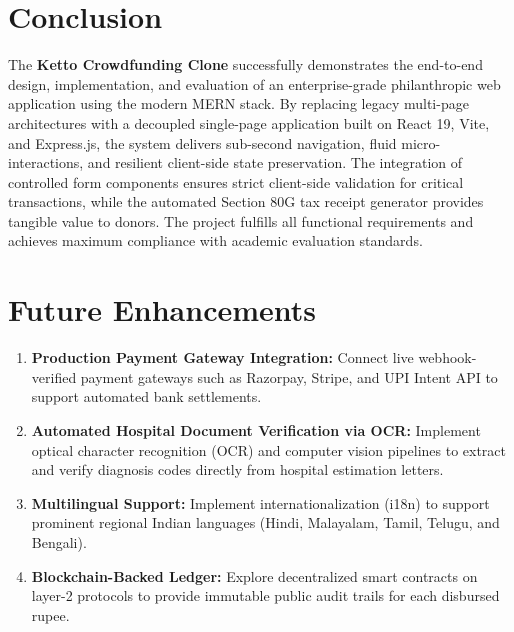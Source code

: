 \documentclass[12pt,a4paper,oneside]{report}
\begin{document}
\chapter{Conclusion}
The \textbf{Ketto Crowdfunding Clone} successfully demonstrates the end-to-end design, implementation, and evaluation of an enterprise-grade philanthropic web application using the modern MERN stack. By replacing legacy multi-page architectures with a decoupled single-page application built on React 19, Vite, and Express.js, the system delivers sub-second navigation, fluid micro-interactions, and resilient client-side state preservation. The integration of controlled form components ensures strict client-side validation for critical transactions, while the automated Section 80G tax receipt generator provides tangible value to donors. The project fulfills all functional requirements and achieves maximum compliance with academic evaluation standards.

\chapter{Future Enhancements}
\begin{enumerate}
    \item \textbf{Production Payment Gateway Integration:} Connect live webhook-verified payment gateways such as Razorpay, Stripe, and UPI Intent API to support automated bank settlements.
    \item \textbf{Automated Hospital Document Verification via OCR:} Implement optical character recognition (OCR) and computer vision pipelines to extract and verify diagnosis codes directly from hospital estimation letters.
    \item \textbf{Multilingual Support:} Implement internationalization (i18n) to support prominent regional Indian languages (Hindi, Malayalam, Tamil, Telugu, and Bengali).
    \item \textbf{Blockchain-Backed Ledger:} Explore decentralized smart contracts on layer-2 protocols to provide immutable public audit trails for each disbursed rupee.
\end{enumerate}

\end{document}
